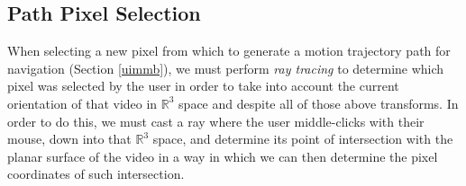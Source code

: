 \subsection{Path Pixel Selection}
\label{raytracing}
When selecting a new pixel from which to generate a motion trajectory path for navigation (Section \ref{uimmb}), we must perform \emph{ray tracing} to determine which pixel was selected by the user in order to take into account the current orientation of that video in $\mathbb{R}^3$ space and despite all of those above transforms. In order to do this, we must cast a ray where the user middle-clicks with their mouse, down into that $\mathbb{R}^3$ space, and determine its point of intersection with the planar surface of the video in a way in which we can then determine the pixel coordinates of such intersection.\par
